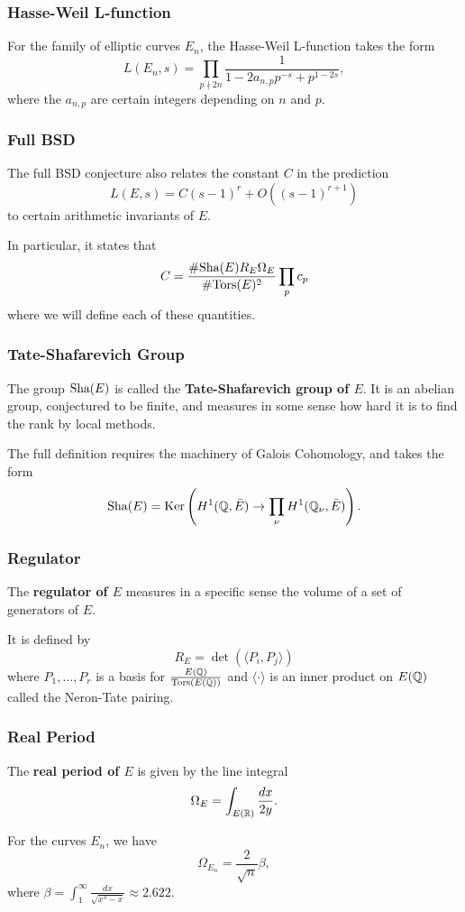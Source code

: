 \documentclass{beamer}
\begin{document}
\begin{frame}
  \frametitle{Hasse-Weil L-function}
  For the family of elliptic curves $E_n$, the Hasse-Weil L-function takes the
  form
  \[L(E_n, s) = \prod\limits_{p \nmid 2n} \frac{1}{1 - 2a_{n,p}p^{-s} + p^{1-2s}},\]
  where the $a_{n,p}$ are certain integers depending on $n$ and $p$.
\end{frame}

\begin{frame}
  \frametitle{Full BSD}
  The full BSD conjecture also relates the constant $C$ in the prediction
  \[L(E,s) = C(s-1)^r + O((s-1)^{r+1})\]
  to certain arithmetic invariants of $E$. \pause
  \bigskip

  In particular, it states that
  \[C = \frac{\# \text{\normalfont Sha}(E) R_E \Omega_E}{\# {\text{\normalfont Tors}}(E)^2} \prod\limits_p c_p\]
  where we will define each of these quantities.
\end{frame}

\begin{frame}
  \frametitle{Tate-Shafarevich Group}
  The group $\text{\normalfont Sha}(E)$ is called the \textbf{Tate-Shafarevich group of $E$}. It
  is an abelian group, conjectured to be finite, and measures in some sense how
  hard it is to find the rank by local methods. \pause
  \bigskip
  
  The full definition requires the machinery of Galois Cohomology, and takes the
  form
  \[\text{\normalfont Sha}(E) = \textnormal{Ker} \left( H^1({\mathbb Q},\bar{E}) \rightarrow \prod\limits_\nu
    H^1({\mathbb Q}_\nu, \bar{E})\right).\]
\end{frame}

\begin{frame}
  \frametitle{Regulator}
  The \textbf{regulator of $E$} measures in a specific sense the volume of a set
  of generators of $E$. \pause
  \bigskip

  It is defined by
  \[R_E = \det \left( \langle P_i, P_j \rangle \right)\]
  where $P_1, \dots, P_r$ is a basis for $\frac{E({\mathbb Q})}{{\text{\normalfont Tors}}(E({\mathbb Q}))}$ and
  $\langle \cdot \rangle$ is an inner product on $E({\mathbb Q})$ called the Neron-Tate pairing.
\end{frame}

\begin{frame}
  \frametitle{Real Period}
  The \textbf{real period of $E$} is given by the line integral
  \[\Omega_E = \int_{E({\mathbb R})} \frac{dx}{2y}.\]

  For the curves $E_n$, we have
  \[\Omega_{E_n} = \frac{2}{\sqrt{n}} \beta,\]
  where $\beta = \int_1^\infty \frac{dx}{\sqrt{x^3-x}} \approx 2.622.$
\end{frame}
\end{document}
